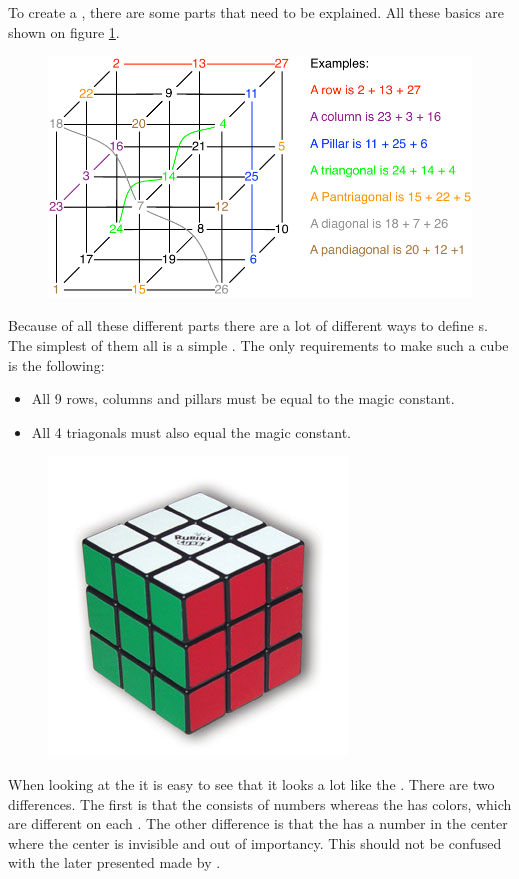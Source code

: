 To create a  \mcube{}, there are some parts that need to be explained.
All these basics are shown on figure \ref{fig:cubeparts}.

\begin{figure}[h]
	\centering
		\includegraphics[scale=0.5]{input/pics/cubeparts.pdf}
	\caption{}
	\label{fig:cubeparts}
\end{figure}

Because of all these different parts there are a lot of different ways to define  \mcube{}s.
The simplest of them all is a simple  \mcube{}. The only requirements to make such a cube is the following:
\begin{itemize}
	\item All 9 rows, columns and pillars must be equal to the magic constant.
	\item All 4 triagonals must also equal the magic constant.
\end{itemize}

\begin{figure}[h]
	\centering
		\includegraphics[scale=0.4]{input/pics/rubiksCube}
	\caption{}
	\label{fig:rubiksCube}
\end{figure}

When looking at the \rubik{} it is easy to see that it looks a lot like the \mcube{}. 
There are two differences. 
The first is that the \mcube{} consists of numbers whereas the \rubik{} has colors, which are different on each \face{}.
The other difference is that the \mcube{} has a number in the center where the \rubik{} center is invisible and out of importancy. This \mcube{} should not be confused with the later presented \mcube{} made by \erno{}.
